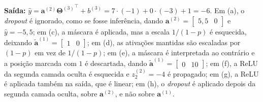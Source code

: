 \documentclass{dlproblemset}
\begin{document}
\begin{enumerate}[1)]
\[    \]
    \textbf{Saída:} $\hat{y} = \mathbf{a}^{(2)}{\mathbf{\Theta}^{(3)}}^{\top} + b^{(3)} = 7\cdot(-1) + 0\cdot(-3) + 1 = -6$. Em (a), o \textit{dropout} é ignorado, como se fosse inferência, dando $\mathbf{a}^{(2)} = \begin{bmatrix} 5{,}5 & 0 \end{bmatrix}$ e $\hat{y} = -5{,}5$; em (c), a máscara é aplicada, mas a escala $1/(1-p)$ é esquecida, deixando $\widetilde{\mathbf{a}}^{(1)} = \begin{bmatrix} 1 & 0 \end{bmatrix}$; em (d), as ativações mantidas são escaladas por $(1-p)$ em vez de $1/(1-p)$; em (e), a máscara é interpretada ao contrário e a posição marcada com $1$ é descartada, dando $\widetilde{\mathbf{a}}^{(1)} = \begin{bmatrix} 0 & 10 \end{bmatrix}$; em (f), a ReLU da segunda camada oculta é esquecida e $z^{(2)}_2 = -4$ é propagado; em (g), a ReLU é aplicada também na saída, que é linear; em (h), o \textit{dropout} é aplicado depois da segunda camada oculta, sobre $\mathbf{a}^{(2)}$, e não sobre $\mathbf{a}^{(1)}$.
\end{enumerate}
\end{document}

